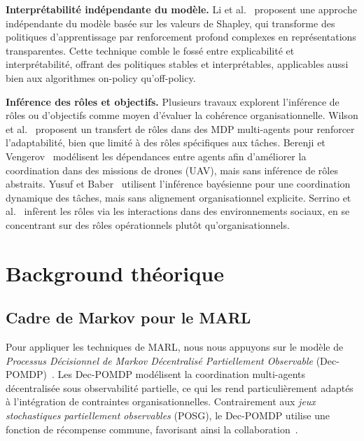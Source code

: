 \documentclass[pdflatex,sn-mathphys-num]{sn-jnl}%
\theoremstyle{thmstyleone}%
\theoremstyle{thmstyletwo}%
\theoremstyle{thmstylethree}%
\begin{document}
\textbf{Interprétabilité indépendante du modèle.} Li et al.~\cite{li2025from} proposent une approche indépendante du modèle basée sur les valeurs de Shapley, qui transforme des politiques d’apprentissage par renforcement profond complexes en représentations transparentes. Cette technique comble le fossé entre explicabilité et interprétabilité, offrant des politiques stables et interprétables, applicables aussi bien aux algorithmes on-policy qu’off-policy.

\textbf{Inférence des rôles et objectifs.} Plusieurs travaux explorent l’inférence de rôles ou d’objectifs comme moyen d’évaluer la cohérence organisationnelle. Wilson et al.~\cite{wilson2008learning} proposent un transfert de rôles dans des MDP multi-agents pour renforcer l’adaptabilité, bien que limité à des rôles spécifiques aux tâches. Berenji et Vengerov~\cite{berenji2000learning} modélisent les dépendances entre agents afin d’améliorer la coordination dans des missions de drones (UAV), mais sans inférence de rôles abstraits. Yusuf et Baber~\cite{yusuf2020inferential} utilisent l’inférence bayésienne pour une coordination dynamique des tâches, mais sans alignement organisationnel explicite. Serrino et al.~\cite{serrino2019finding} infèrent les rôles via les interactions dans des environnements sociaux, en se concentrant sur des rôles opérationnels plutôt qu’organisationnels.



\section{Background théorique}\label{sec:background}

\subsection{Cadre de Markov pour le MARL}

Pour appliquer les techniques de MARL, nous nous appuyons sur le modèle de \textit{Processus Décisionnel de Markov Décentralisé Partiellement Observable} (Dec-POMDP)~\cite{Oliehoek2016}. Les Dec-POMDP modélisent la coordination multi-agents décentralisée sous observabilité partielle, ce qui les rend particulièrement adaptés à l’intégration de contraintes organisationnelles. Contrairement aux \textit{jeux stochastiques partiellement observables} (POSG), le Dec-POMDP utilise une fonction de récompense commune, favorisant ainsi la collaboration~\cite{Beynier2013}.
\end{document}
